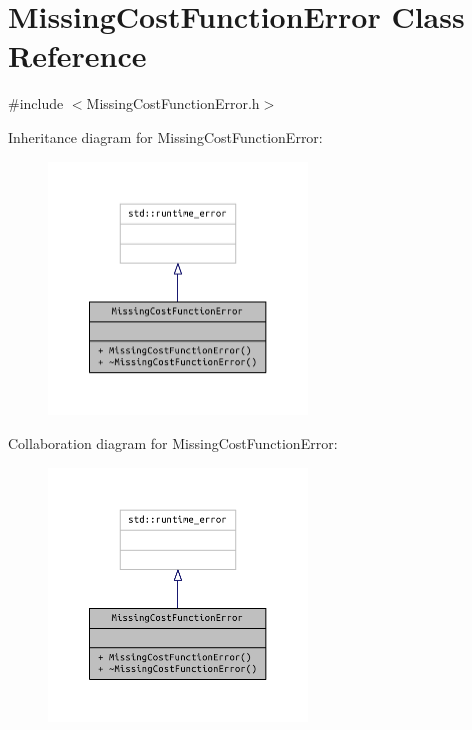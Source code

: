 \section{Missing\+Cost\+Function\+Error Class Reference}
\label{class_missing_cost_function_error}


{\ttfamily \#include $<$Missing\+Cost\+Function\+Error.\+h$>$}



Inheritance diagram for Missing\+Cost\+Function\+Error\+:
\nopagebreak
\begin{figure}[H]
\begin{center}
\leavevmode
\includegraphics[width=195pt]{class_missing_cost_function_error__inherit__graph}
\end{center}
\end{figure}


Collaboration diagram for Missing\+Cost\+Function\+Error\+:
\nopagebreak
\begin{figure}[H]
\begin{center}
\leavevmode
\includegraphics[width=195pt]{class_missing_cost_function_error__coll__graph}
\end{center}
\end{figure}
